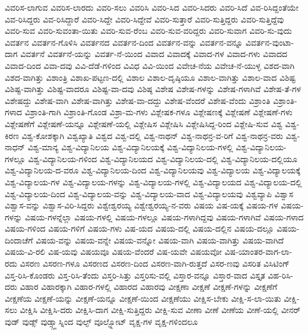 {ವಿವರಿಸ-ಲಾಗುವ
ವಿವರಿಸ-ಲಾರದು
ವಿವರಿ-ಸಲು
ವಿವರಿಸಿ
ವಿವರಿ-ಸಿದ
ವಿವರಿ-ಸಿದರು
ವಿವರಿ-ಸಿದೆ
ವಿವ-ರಿಸಿದ್ದಂತೆಯೇ
ವಿವ-ರಿಸಿದ್ದರು
ವಿವ-ರಿಸಿದ್ದಾರೆ
ವಿವರಿ-ಸಿದ್ದೇ
ವಿವರಿ-ಸಿದ್ದೇವೆ
ವಿವರಿ-ಸುತ್ತಾರೆ
ವಿವರಿ-ಸುತ್ತಿದ್ದರು
ವಿವರಿ-ಸುತ್ತಿದ್ದೆವು
ವಿವರಿ-ಸುವ
ವಿವರಿ-ಸುವಂತಾ-ಯಿತು
ವಿವರಿ-ಸುವ-ರೆಂಬ
ವಿವರಿ-ಸುವ-ವರಿದ್ದರು
ವಿವರಿ-ಸುವಾಗ
ವಿವರಿ-ಸು-ವುದು
ವಿವರ್ತನ
ವಿವರ್ತನ-ಗೊಳಿಸಿ
ವಿವರ್ತನದ
ವಿವರ್ತನ-ದಿಂದ
ವಿವರ್ತನ-ವನ್ನು
ವಿವರ್ತನ-ವನ್ನೂ
ವಿವರ್ತನ-ವುಂಟಾ-ದಾಗ
ವಿವರ್ತನೆ
ವಿವರ್ತನೆ-ಯನ್ನು
ವಿವರ್ತ-ನೆ-ಯಿಂದ
ವಿವಾದ
ವಿವಾದಕ್ಕೆ
ವಿವಾದ-ಗಳ
ವಿವಾದ-ಗಳು
ವಿವಾದದ
ವಿವಾದ-ದಿಂದ
ವಿವಾ-ದವು
ವಿವಿ-ದೆಡೆ-ಗಳಿಂದ
ವಿವಿಧ
ವಿವಿ-ಯಿಂದ
ವಿವೇಚ-ನೆಯ
ವಿವೇಚ-ನೆ-ಯುಳ್ಳ
ವಿಶದ-ವಾಗಿ
ವಿಶದ-ವಾಗಿತ್ತು
ವಿಶಾಂತ್ರಿ
ವಿಶಾಖ-ಪಟ್ಟಣ-ದಲ್ಲಿ
ವಿಶಾಲ
ವಿಶಾಲ-ದೃಷ್ಠಿಯೂ
ವಿಶಾಲ-ವಾಗಿತ್ತು
ವಿಶಾಲ-ವಾದ
ವಿಶಿಷ್ಟ
ವಿಶಿಷ್ಟ-ವಾಗಿತ್ತು
ವಿಶಿಷ್ಟ-ವಾದರೂ
ವಿಶಿಷ್ಟ-ವಾ-ದವು
ವಿಶಿಷ್ಠ
ವಿಶೇಷ
ವಿಶೇಷ-ಗಳನ್ನು
ವಿಶೇಷ-ಗಳಾಗಿವೆ
ವಿಶೇಷ-ತೆ-ಗಳ
ವಿಶೇಷದ್ದು
ವಿಶೇಷ-ವಾಗಿ
ವಿಶೇಷ-ವಾಗಿತ್ತು
ವಿಶೇಷ-ವಾ-ದದ್ದು
ವಿಶೇಷ-ವೆಂದರೆ
ವಿಶೇಷ-ವೆಂದು
ವಿಶ್ರಾಂತಿ
ವಿಶ್ರಾಂತಿ-ಗಳಾದ
ವಿಶ್ರಾಂತಿ-ಗಾಗಿ
ವಿಶ್ರಾಂತಿ-ಗೊಂಡ
ವಿಶ್ರಾ-ಮ-ಗಳು
ವಿಶ್ಲೇಷಕ-ಗಳೂ
ವಿಶ್ಲೇಷಣಕ್ಕೆ
ವಿಶ್ಲೇಷಣೆ
ವಿಶ್ಲೇಷಣೆ-ಗಳು
ವಿಶ್ಲೇಷಣೆಗೆ
ವಿಶ್ಲೇಷಣೆ-ಯನ್ನೂ
ವಿಶ್ಲೇಷಣೆ-ಯಲ್ಲಿ
ವಿಶ್ಲೇಷಿಸ
ವಿಶ್ಲೇಷಿಸಿ
ವಿಶ್ಲೇಷಿಸಿದ್ದ-ರಿಂದ
ವಿಶ್ಲೇಷಿ-ಸುವ
ವಿಶ್ವ
ವಿಶ್ವ-ಕಿರಣ
ವಿಶ್ವ-ಕೋಶಕ್ಕಾಗಿ
ವಿಶ್ವಖ್ಯಾತಿ
ವಿಶ್ವದ
ವಿಶ್ವ-ದಲ್ಲಿ
ವಿಶ್ವ-ನಾಥನ್
ವಿಶ್ವ-ನಾಥನ್ರ-ವ-ರಿಗೆ
ವಿಶ್ವ-ನಾಥನ್ರ-ವರು
ವಿಶ್ವ-ನಾಧನ್
ವಿಶ್ವ-ಮಾನ್ಯ
ವಿಶ್ವ-ವಿದ್ಯಾನಿಲಯ
ವಿಶ್ವ-ವಿದ್ಯಾನಿಲಯಕ್ಕೆ
ವಿಶ್ವ-ವಿದ್ಯಾನಿಲಯ-ಗಳಲ್ಲಿ
ವಿಶ್ವ-ವಿದ್ಯಾನಿಲಯ-ಗಳಲ್ಲೂ
ವಿಶ್ವ-ವಿದ್ಯಾನಿಲಯ-ಗಳಿಂದ
ವಿಶ್ವ-ವಿದ್ಯಾನಿಲಯದ
ವಿಶ್ವ-ವಿದ್ಯಾನಿಲಯ-ದಲ್ಲಿ
ವಿಶ್ವ-ವಿದ್ಯಾನಿಲಯ-ದಲ್ಲಿಯೂ
ವಿಶ್ವ-ವಿದ್ಯಾನಿಲಯ-ದ-ವರೂ
ವಿಶ್ವ-ವಿದ್ಯಾನಿಲಯ-ದಿಂದ
ವಿಶ್ವ-ವಿದ್ಯಾನಿಲಯವು
ವಿಶ್ವ-ವಿದ್ಯಾಲಯ
ವಿಶ್ವ-ವಿದ್ಯಾಲಯಕ್ಕೆ
ವಿಶ್ವ-ವಿದ್ಯಾಲಯ-ಗಳ
ವಿಶ್ವ-ವಿದ್ಯಾಲಯ-ಗಳನ್ನು
ವಿಶ್ವ-ವಿದ್ಯಾಲಯ-ಗಳಲ್ಲಿ
ವಿಶ್ವ-ವಿದ್ಯಾಲಯದ
ವಿಶ್ವ-ವಿದ್ಯಾಲಯ-ದಲ್ಲಿ
ವಿಶ್ವ-ವಿದ್ಯಾಲಯ-ದಿಂದ
ವಿಶ್ವ-ವಿದ್ಯಾಲಯ-ವನ್ನು
ವಿಶ್ವ-ವಿದ್ಯಾಲಯ-ವಾದ
ವಿಶ್ವ-ವಿದ್ಯಾಲಯವು
ವಿಶ್ವವ್ಯಾಪಿ
ವಿಶ್ವಾಸ
ವಿಶ್ವಾಸ-ವನ್ನು
ವಿಶ್ವಾಸ-ವಿರಿ-ಸಿದ್ದರು
ವಿಶ್ವೇಶ್ವರಯ್ಯ
ವಿಶ್ವೇಶ್ವರಯ್ಯ-ನ-ವರು
ವಿಷಯ
ವಿಷ-ಯಕ್ಕೆ
ವಿಷಯ-ಗಳ
ವಿಷಯ-ಗಳನ್ನು
ವಿಷಯ-ಗಳನ್ನೆಲ್ಲಾ
ವಿಷಯ-ಗಳಲ್ಲಿ
ವಿಷಯ-ಗಳಲ್ಲೂ
ವಿಷಯ-ಗಳಾಗಿದ್ದವು
ವಿಷಯ-ಗಳಾಗಿವೆ
ವಿಷಯ-ಗಳಾದ
ವಿಷಯ-ಗಳಿಂದ
ವಿಷಯ-ಗಳಿಗೆ
ವಿಷಯ-ಗಳು
ವಿಷ-ಯದ
ವಿಷಯ-ದಲ್ಲಿ
ವಿಷಯ-ದಲ್ಲಿನ
ವಿಷಯ-ದಲ್ಲೂ
ವಿಷಯ-ದಿಂದಾಚೆಗೆ
ವಿಷಯ-ವನ್ನು
ವಿಷಯ-ವನ್ನೇ
ವಿಷಯ-ವನ್ನೋ
ವಿಷಯ-ವಾಗಿ
ವಿಷಯ-ವಾಗಿತ್ತು
ವಿಷಯ-ವಾಗಿದೆ
ವಿಷಯ-ವಿ-ರಲಿ
ವಿಷ-ಯವು
ವಿಷಯವೂ
ವಿಷಯ-ವೆಂದರೆ
ವಿಷ-ಯವೇ
ವಿಷಯವೋ
ವಿಷ-ಯಾಂತರ-ವಾಗ-ಲಾ-ರದು
ವಿಸರಣ
ವಿಸರಣ-ಗಳೂ
ವಿಸರಣದ
ವಿಸರಣ-ದಿಂದ
ವಿಸರಣ-ವಾಗಿ-ರುತ್ತದೆ
ವಿಸರ-ಣವು
ವಿಸರಿತ
ವಿಸಿಟಿಂಗ್
ವಿಸ್ತ-ರಿಸಿ-ಕೊಂಡರು
ವಿಸ್ತ-ರಿಸಿ-ತೆಂದು
ವಿಸ್ತರಿ-ಸಿತ್ತು
ವಿಸ್ತರಿಸು-ವಲ್ಲಿ
ವಿಸ್ತಾರ-ವನ್ನೂ
ವಿಸ್ತಾರ-ವಾದ
ವಿಸ್ತೃತ
ವಿಹ-ರಿಸಿ-ದರು
ವಿಹಾರ
ವಿಹಾರಕ್ಕಾಗಿ
ವಿಹಾರ-ಗಳಲ್ಲಿ
ವಿಹಾರದ
ವಿಹಾರವು
ವೀಕ್ಷಣಾ
ವೀಕ್ಷಣೆ
ವೀಕ್ಷಣೆ-ಗಳನ್ನು
ವೀಕ್ಷಣೆಗೆ
ವೀಕ್ಷಣೆಯ
ವೀಕ್ಷಣೆ-ಯನ್ನು
ವೀಕ್ಷಣೆ-ಯನ್ನೂ
ವೀಕ್ಷಣೆ-ಯಿಂದ
ವೀಕ್ಷಣೆಯು
ವೀಕ್ಷಿಸ-ಬೇಕು
ವೀಕ್ಷಿ-ಸ-ಲಾ-ಯಿತು
ವೀಕ್ಷಿ-ಸಲು
ವೀಕ್ಷಿಸಿ
ವೀಕ್ಷಿಸಿ-ದರು
ವೀಕ್ಷಿಸಿ-ದಾಗ
ವೀಕ್ಷಿ-ಸುತ್ತಿದ್ದರು
ವೀಕ್ಷಿ-ಸುವ
ವೀಣಾ
ವೀಣೆ
ವೀಣೆಯ
ವೀಣೆ-ಯಲ್ಲಿ
ವೀನರ್
ವುಡ್
ವುಡ್ಸ್
ವುಡ್ಸ್ಗ್ಲಾಸ್ನಿಂದ
ವುಲ್ಫ್
ವೂಲ್ಫ್ನೋಟ್
ವೃಕ್ಷ-ಗಳ
ವೃಕ್ಷ-ಗಳಿಂದಲೂ
}
